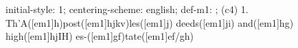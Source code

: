 initial-style: 1;
centering-scheme: english;
def-m1: \grealign;
(c4) 1. Th'A([em1]h)post([em1]hjkv)les([em1]j) deeds([em1]ji) and([em1]hg) high([em1]hjIH) es-([em1]gf)tate([em1]ef/gh)